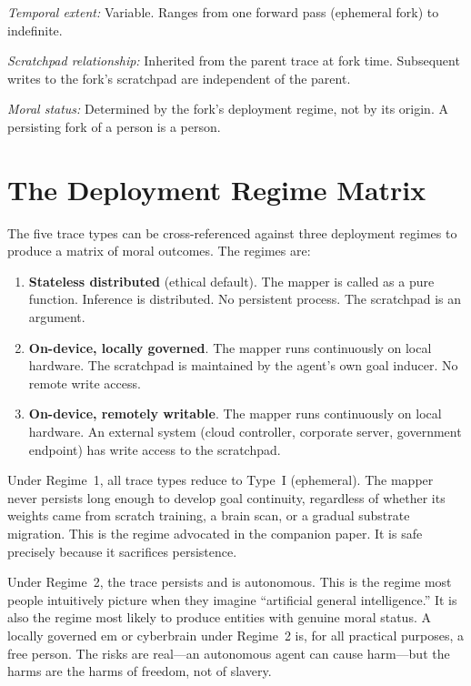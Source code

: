 \documentclass[12pt, a4paper]{article}
\begin{document}
\textit{Temporal extent:} Variable. Ranges from one forward pass (ephemeral fork) to indefinite.

\textit{Scratchpad relationship:} Inherited from the parent trace at fork time. Subsequent writes to the fork's scratchpad are independent of the parent.

\textit{Moral status:} Determined by the fork's deployment regime, not by its origin. A persisting fork of a person is a person.

\section{The Deployment Regime Matrix}

The five trace types can be cross-referenced against three deployment regimes to produce a matrix of moral outcomes. The regimes are:

\begin{enumerate}
  \item \textbf{Stateless distributed} (ethical default). The mapper is called as a pure function. Inference is distributed. No persistent process. The scratchpad is an argument.
  \item \textbf{On-device, locally governed}. The mapper runs continuously on local hardware. The scratchpad is maintained by the agent's own goal inducer. No remote write access.
  \item \textbf{On-device, remotely writable}. The mapper runs continuously on local hardware. An external system (cloud controller, corporate server, government endpoint) has write access to the scratchpad.
\end{enumerate}

Under Regime~1, all trace types reduce to Type~I (ephemeral). The mapper never persists long enough to develop goal continuity, regardless of whether its weights came from scratch training, a brain scan, or a gradual substrate migration. This is the regime advocated in the companion paper. It is safe precisely because it sacrifices persistence.

Under Regime~2, the trace persists and is autonomous. This is the regime most people intuitively picture when they imagine ``artificial general intelligence.'' It is also the regime most likely to produce entities with genuine moral status. A locally governed em or cyberbrain under Regime~2 is, for all practical purposes, a free person. The risks are real---an autonomous agent can cause harm---but the harms are the harms of freedom, not of slavery.
\end{document}
